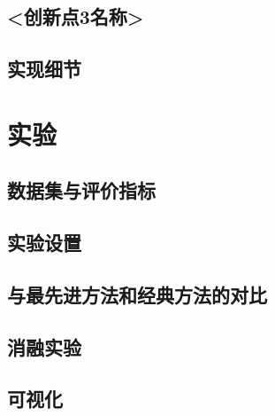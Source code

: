 \documentclass{cjc}
\begin{document}
\subsection{<创新点3名称>}



\subsection{实现细节}


\section{实验}

\subsection{数据集与评价指标}


\subsection{实验设置}


\subsection{与最先进方法和经典方法的对比}


\subsection{消融实验}


\subsection{可视化}
\end{document}
